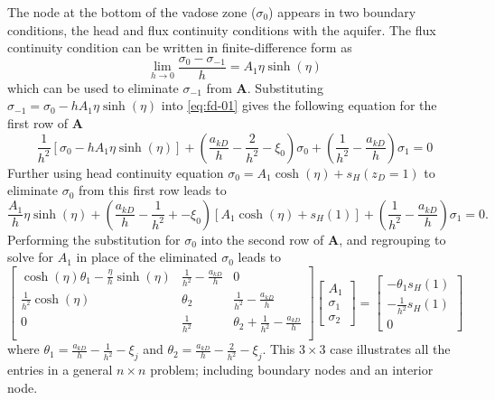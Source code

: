 \documentclass[12pt,letterpaper]{article}
\begin{document}
The node at the bottom of the vadose zone ($\sigma_0$) appears in two
boundary conditions, the head and flux continuity conditions with the
aquifer.  The flux continuity condition can be written in
finite-difference form as
\begin{equation}
 \nonumber
  \lim_{h \rightarrow 0} \frac{\sigma_0 - \sigma_{-1}}{h} = A_1 \eta \sinh(\eta)
\end{equation}
which can be used to eliminate $\sigma_{-1}$ from $\mathbf{A}$.
Substituting $\sigma_{-1} = \sigma_0 - hA_1 \eta \sinh(\eta)$ into
\eqref{eq:fd-01} gives the following equation for the first row of
$\mathbf{A}$
\begin{equation}
  \nonumber
  \frac{1}{h^2} \left[ \sigma_0 - hA_1 \eta \sinh(\eta)\right] +
  \left(\frac{a_{kD}}{h} - \frac{2}{h^2}  - \xi_0\right) \sigma_0
  + \left(\frac{1}{h^2} - \frac{a_{kD}}{h}\right) \sigma_1 = 0
\end{equation}
Further using head continuity equation $\sigma_0 = A_1 \cosh(\eta) +
s_{H}(z_D=1)$ to eliminate $\sigma_0$ from this first row leads to
\begin{equation}
 \nonumber
    \frac{A_1}{h}  \eta \sinh(\eta) +
  \left( \frac{a_{kD}}{h} - \frac{1}{h^2} + - \xi_0\right) \left[
    A_1 \cosh(\eta) + s_{H}(1)\right] + \left(\frac{1}{h^2} -
    \frac{a_{kD}}{h}\right) \sigma_1 = 0.
\end{equation}
Performing the substitution for $\sigma_0$ into the second row of
$\mathbf{A}$, and regrouping to solve for $A_1$ in place of the
eliminated $\sigma_0$ leads to
 \begin{equation}
  \label{eq:fd-02}
  \left[ \begin{matrix}
     \cosh(\eta)\theta_1 - \frac{\eta}{h} \sinh(\eta) &
    \frac{1}{h^2} - \frac{a_{kD}}{h} & 0 \\
     \frac{1}{h^2}\cosh(\eta) & \theta_2 &
    \frac{1}{h^2} - \frac{a_{kD}}{h}   \\
     0 & \frac{1}{h^2} & \theta_2 +
    \frac{1}{h^2} - \frac{a_{kD}}{h} \\
  \end{matrix}\right]
\left[\begin{matrix}
A_1 \\ \sigma_1 \\ \sigma_2
\end{matrix}\right]
=
\left[\begin{matrix}
-\theta_1 s_H(1) \\
-\frac{1}{h^2}s_H(1) \\ 0
\end{matrix}\right]
\end{equation}
where $\theta_1 = \frac{a_{kD}}{h} - \frac{1}{h^2} - \xi_j$ and
$\theta_2 = \frac{a_{kD}}{h} - \frac{2}{h^2} - \xi_j $.  This $3\times
3$ case illustrates all the entries in a general $n\times n$ problem;
including boundary nodes and an interior node.
\end{document}
